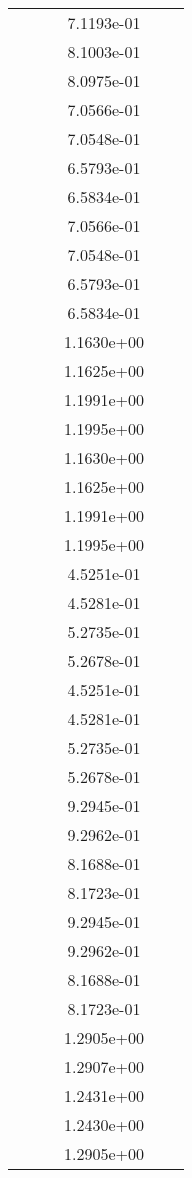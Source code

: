 \begin{xltabular}{\textwidth}{r|rS[table-format=1.3e+2]S[table-format=1.4e+2]S[table-format=1.4e+2]S[table-format=-1.5]}
&  &  & 7.1193e-01 & & \\
&  &  & 8.1003e-01 & & \\
&  &  & 8.0975e-01 & & \\
&  &  & 7.0566e-01 & & \\
&  &  & 7.0548e-01 & & \\
&  &  & 6.5793e-01 & & \\
&  &  & 6.5834e-01 & & \\
&  &  & 7.0566e-01 & & \\
&  &  & 7.0548e-01 & & \\
&  &  & 6.5793e-01 & & \\
&  &  & 6.5834e-01 & & \\
&  &  & 1.1630e+00 & & \\
&  &  & 1.1625e+00 & & \\
&  &  & 1.1991e+00 & & \\
&  &  & 1.1995e+00 & & \\
&  &  & 1.1630e+00 & & \\
&  &  & 1.1625e+00 & & \\
&  &  & 1.1991e+00 & & \\
&  &  & 1.1995e+00 & & \\
&  &  & 4.5251e-01 & & \\
&  &  & 4.5281e-01 & & \\
&  &  & 5.2735e-01 & & \\
&  &  & 5.2678e-01 & & \\
&  &  & 4.5251e-01 & & \\
&  &  & 4.5281e-01 & & \\
&  &  & 5.2735e-01 & & \\
&  &  & 5.2678e-01 & & \\
&  &  & 9.2945e-01 & & \\
&  &  & 9.2962e-01 & & \\
&  &  & 8.1688e-01 & & \\
&  &  & 8.1723e-01 & & \\
&  &  & 9.2945e-01 & & \\
&  &  & 9.2962e-01 & & \\
&  &  & 8.1688e-01 & & \\
&  &  & 8.1723e-01 & & \\
&  &  & 1.2905e+00 & & \\
&  &  & 1.2907e+00 & & \\
&  &  & 1.2431e+00 & & \\
&  &  & 1.2430e+00 & & \\
&  &  & 1.2905e+00 & & \\

\end{xltabular}
